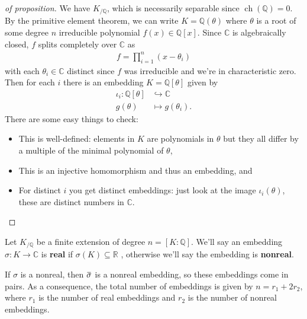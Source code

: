 \begin{proof}[of proposition]

We have \(K_{/{\mathbb{Q}}}\), which is necessarily separable since
\(\operatorname{ch}({\mathbb{Q}}) = 0\). By the primitive element
theorem, we can write \(K = {\mathbb{Q}}(\theta)\) where \(\theta\) is a
root of some degree \(n\) irreducible polynomial
\(f(x) \in {\mathbb{Q}}[x]\). Since \({\mathbb{C}}\) is algebraically
closed, \(f\) splits completely over \({\mathbb{C}}\) as
\begin{align*}
f = \prod_{i=1}^n (x- \theta_i) 
\end{align*}
with each \(\theta_i \in {\mathbb{C}}\) distinct since \(f\) was
irreducible and we're in characteristic zero. Then for each \(i\) there
is an embedding \(K = {\mathbb{Q}}[\theta]\) given by
\begin{align*}
\iota_i: {\mathbb{Q}}[\theta] &\hookrightarrow{\mathbb{C}}\\
g(\theta) &\mapsto g(\theta_i)
.\end{align*}
There are some easy things to check:

\begin{itemize}
\tightlist
\item
  This is well-defined: elements in \(K\) are polynomials in \(\theta\)
  but they all differ by a multiple of the minimal polynomial of
  \(\theta\),
\item
  This is an injective homomorphism and thus an embedding, and
\item
  For distinct \(i\) you get distinct embeddings: just look at the image
  \(\iota_i(\theta)\), these are distinct numbers in \({\mathbb{C}}\).
\end{itemize}

\end{proof}

\begin{definition}

Let \(K_{/{\mathbb{Q}}}\) be a finite extension of degree
\(n = [K : {\mathbb{Q}}]\). We'll say an embedding
\(\sigma:K \to {\mathbb{C}}\) is \textbf{real} if
\(\sigma(K) \subseteq {\mathbb{R}}\) , otherwise we'll say the embedding
is \textbf{nonreal}.

\end{definition}

\begin{remark}

If \(\sigma\) is a nonreal, then
\(\mkern 1.5mu\overline{\mkern-1.5mu\sigma\mkern-1.5mu}\mkern 1.5mu\) is
a nonreal embedding, so these embeddings come in pairs. As a
consequence, the total number of embeddings is given by
\(n = r_1 + 2r_2\), where \(r_1\) is the number of real embeddings and
\(r_2\) is the number of nonreal embeddings.

\end{remark}

